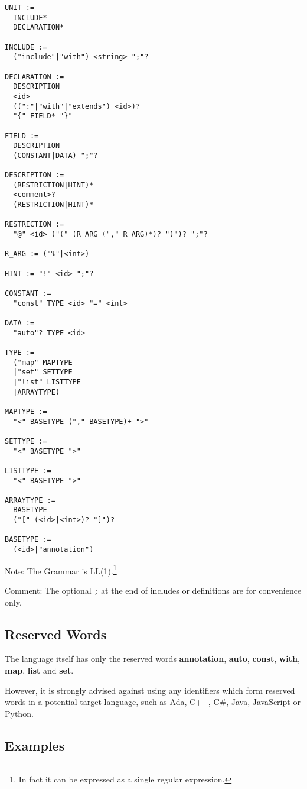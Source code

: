 \documentclass[a4paper,10pt]{article}
\begin{document}
\begin{verbatim}
UNIT :=
  INCLUDE*
  DECLARATION*

INCLUDE := 
  ("include"|"with") <string> ";"?

DECLARATION :=
  DESCRIPTION
  <id>
  ((":"|"with"|"extends") <id>)?
  "{" FIELD* "}"
  
FIELD :=
  DESCRIPTION
  (CONSTANT|DATA) ";"?
  
DESCRIPTION := 
  (RESTRICTION|HINT)*
  <comment>?
  (RESTRICTION|HINT)*
  
RESTRICTION :=
  "@" <id> ("(" (R_ARG ("," R_ARG)*)? ")")? ";"?
  
R_ARG := ("%"|<int>)

HINT := "!" <id> ";"?
  
CONSTANT :=
  "const" TYPE <id> "=" <int>
  
DATA :=
  "auto"? TYPE <id>
  
TYPE :=
  ("map" MAPTYPE
  |"set" SETTYPE
  |"list" LISTTYPE
  |ARRAYTYPE)
  
MAPTYPE :=
  "<" BASETYPE ("," BASETYPE)+ ">"
  
SETTYPE :=
  "<" BASETYPE ">"
  
LISTTYPE :=
  "<" BASETYPE ">"
  
ARRAYTYPE :=
  BASETYPE
  ("[" (<id>|<int>)? "]")?
  
BASETYPE :=
  (<id>|"annotation")

\end{verbatim}
Note: The Grammar is LL(1).\footnote{In fact it can be expressed as a single regular expression.}

Comment: The optional \texttt{;} at the end of includes or definitions are for convenience only.

\subsection{Reserved Words}

The language itself has only the reserved words \textbf{annotation}, \textbf{auto}, \textbf{const}, \textbf{with}, \textbf{map}, \textbf{list} and \textbf{set}. 

However, it is strongly advised against using any identifiers which form reserved words in a potential target language, such as Ada, C++, C\#, Java, JavaScript or Python.

\subsection{Examples}
\end{document}
